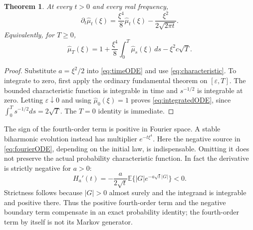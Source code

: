 \documentclass[11pt]{article}
\newtheorem{theorem}{Theorem}[section]
\newcommand{\E}{\mathbb E}
\begin{document}
\begin{theorem}\label{thm:fourierODE}
At every $t>0$ and every real frequency,
\begin{equation}\label{eq:fourierODE}
 \partial_t\widehat\mu_t(\xi)
 =\frac{\xi^4}{8}\widehat\mu_t(\xi)
       -\frac{\xi^2}{2\sqrt{2\pi t}}.
\end{equation}
Equivalently, for $T\geq0$,
\begin{equation}\label{eq:integratedODE}
 \widehat\mu_T(\xi)
 =1+\frac{\xi^4}{8}\int_0^T\widehat\mu_s(\xi)\,ds
       -\xi^2 c\sqrt T.
\end{equation}
\end{theorem}
\begin{proof}
Substitute $a=\xi^2/2$ into \eqref{eq:timeODE} and use
\eqref{eq:characteristic}. To integrate to zero, first apply the
ordinary fundamental theorem on $[\varepsilon,T]$.
The bounded characteristic function is integrable in time and
$s^{-1/2}$ is integrable at zero. Letting $\varepsilon\downarrow0$
and using $\widehat\mu_0(\xi)=1$ proves
\eqref{eq:integratedODE}, since $\int_0^T s^{-1/2}ds=2\sqrt T$.
The $T=0$ identity is immediate.
\end{proof}

The sign of the fourth-order term is positive in Fourier space.
A stable biharmonic evolution instead has multiplier $e^{-t\xi^4}$.
Here the negative source in \eqref{eq:fourierODE}, depending on the
initial law, is indispensable. Omitting it does not preserve the actual
probability characteristic function. In fact the derivative is strictly
negative for $a>0$:
\[
 H_a'(t)=-\frac{a}{2\sqrt t}\E\{|G|e^{-a\sqrt t|G|}\}<0.
\]
Strictness follows because $|G|>0$ almost surely and the integrand is
integrable and positive there. Thus the positive fourth-order term
and the negative boundary term compensate in an exact probability
identity; the fourth-order term by itself is not its Markov generator.
\end{document}

